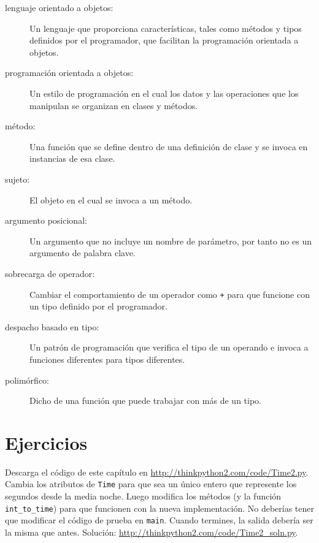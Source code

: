 \documentclass[10pt]{book}
\begin{document}
\begin{description}

\item[lenguaje orientado a objetos:] Un lenguaje que proporciona características,
  tales como métodos y tipos definidos por el programador, que facilitan
  la programación orientada a objetos.

\item[programación orientada a objetos:] Un estilo de programación en el cual
los datos y las operaciones que los manipulan se organizan en clases
y métodos.

\item[método:] Una función que se define dentro de una definición de clase y
se invoca en instancias de esa clase.

\item[sujeto:] El objeto en el cual se invoca a un método.

\item[argumento posicional:]  Un argumento que no incluye
un nombre de parámetro, por tanto no es un argumento de palabra clave.

\item[sobrecarga de operador:] Cambiar el comportamiento de un operador como
{\tt +} para que funcione con un tipo definido por el programador.

\item[despacho basado en tipo:] Un patrón de programación que verifica el tipo
de un operando e invoca a funciones diferentes para tipos diferentes.

\item[polimórfico:] Dicho de una función que puede trabajar con más de
  un tipo.

\end{description}


\section{Ejercicios}

\begin{exercise}

Descarga el código de este capítulo en
\url{http://thinkpython2.com/code/Time2.py}.  Cambia los atributos de
    {\tt Time} para que sea un único entero que represente los segundos desde
    la media noche.  Luego modifica los métodos (y la función
    \verb"int_to_time") para que funcionen con la nueva implementación.  No
    deberías tener que modificar el código de prueba en {\tt main}.  Cuando
    termines, la salida debería ser la misma que antes.  Solución:
    \url{http://thinkpython2.com/code/Time2_soln.py}.

\end{exercise}
\end{document}
